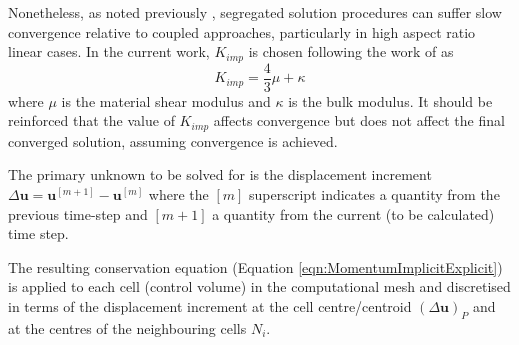\documentclass[sn-mathphys,Numbered,draft]{sn-jnl}%
\begin{document}
Nonetheless, as noted previously \citep{cardiff_block-coupled_2016}, segregated solution procedures can suffer slow convergence relative to coupled approaches, particularly in high aspect ratio linear cases.
In the current work, 
$K_{imp}$ is chosen following the work of \citet{jasak_application_2000} as %
\begin{equation}
	K_{imp} = \frac{4}{3}\mu + \kappa
\end{equation}
where $\mu$ is the material shear modulus and $\kappa$ is the bulk modulus.
It should be reinforced that the value of $K_{imp}$ affects convergence but does not affect the final converged solution, assuming convergence is achieved.

The primary unknown to be solved for is the displacement increment $\Delta \boldsymbol{u}=\boldsymbol{u}^{[m+1]}-\boldsymbol{u}^{[m]}$ where the $[m]$ superscript indicates a quantity from the previous time-step and $[m+1]$ a quantity from the current (to be calculated) time step. 

The resulting conservation equation (Equation \ref{eqn:MomentumImplicitExplicit}) is applied to each cell (control volume) in the computational mesh and discretised in terms of the displacement increment at the cell centre/centroid $(\Delta \mathbf{u})_P$ and at the centres of the neighbouring cells $N_i$.
\end{document}
